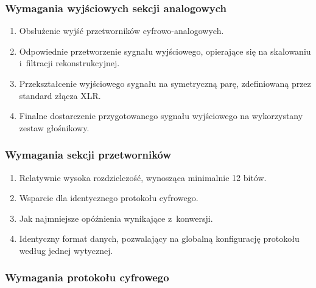 \subsubsection{Wymagania wyjściowych sekcji analogowych}

\begin{enumerate}

    \item Obsłużenie wyjść przetworników cyfrowo-analogowych.

    \item Odpowiednie przetworzenie sygnału wyjściowego, opierające się na
    skalowaniu i~filtracji rekonstrukcyjnej.

    \item Przekształcenie wyjściowego sygnału na symetryczną parę, zdefiniowaną
    przez standard złącza XLR.

    \item Finalne dostarczenie przygotowanego sygnału wyjściowego na
    wykorzystany zestaw głośnikowy.

\end{enumerate}

\subsubsection{Wymagania sekcji przetworników}

\begin{enumerate}

    \item Relatywnie wysoka rozdzielczość, wynosząca minimalnie 12 bitów.
    
    \item Wsparcie dla identycznego protokołu cyfrowego.

    \item Jak najmniejsze opóźnienia wynikające z~konwersji.

    \item Identyczny format danych, pozwalający na globalną konfigurację
    protokołu według jednej wytycznej.

\end{enumerate}

\subsubsection{Wymagania protokołu cyfrowego}

